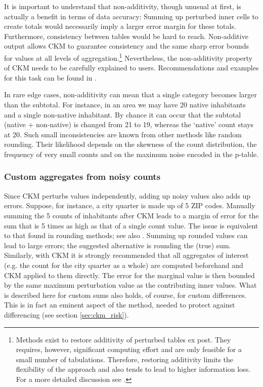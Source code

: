 It is important to understand that non-additivity, though unusual at first, is actually a benefit in terms of data accuracy: Summing up perturbed inner cells to create totals would necessarily imply a larger error margin for these totals. Furthermore, consistency between tables would be hard to reach. Non-additive output allows CKM to guarantee consistency and the same sharp error bounds for values at all levels of aggregation.\footnote{
    Methods exist to restore additivity of perturbed tables ex post. They requires, however, significant computing effort and are only feasible for a small number of tabulations. Therefore, restoring additivity limits the flexibility of the approach and also tends to lead to higher information loss. For a more detailed discussion see \citet{EnderleGiessing2017}.
}
Nevertheless, the non-additivity property of CKM needs to be carefully explained to users. Recommendations and examples for this task can be found in \citet[~ch.5]{Guidelines3_CensusDemog}.

In rare edge cases, non-additivity can mean that a single category becomes larger than the subtotal. For instance, in an area we may have 20 native inhabitants and a single non-native inhabitant. By chance it can occur that the subtotal (native + non-native) is changed from 21 to 19, whereas the `native' count stays at 20. Such small inconsistencies are known from other methods like random rounding. Their likelihood depends on the skewness of the count distribution, the frequency of very small counts and on the maximum noise encoded in the p-table.

\subsubsection{Custom aggregates from noisy counts}

Since CKM perturbs values independently, adding up noisy values also adds up errors. Suppose, for instance, a city quarter is made up of 5 ZIP codes. Manually summing the 5 counts of inhabitants after CKM leads to a margin of error for the sum that is 5 times as high as that of a single count value. The issue is equivalent to that found in rounding methods; see also \citet[5.5]{HundepoolEtAl2024}. Summing up rounded values can lead to large errors; the suggested alternative is rounding the (true) sum. Similarly, with CKM it is strongly recommended that all aggregates of interest (e.g. the count for the city quarter as a whole) are computed beforehand and CKM applied to them directly. The error for the marginal value is then bounded by the same maximum perturbation value as the contributing inner values.
What is described here for custom sums also holds, of course, for custom differences. This is in fact an eminent aspect of the method, needed to protect against differencing (see section \ref{sec:ckm_risk}). 

